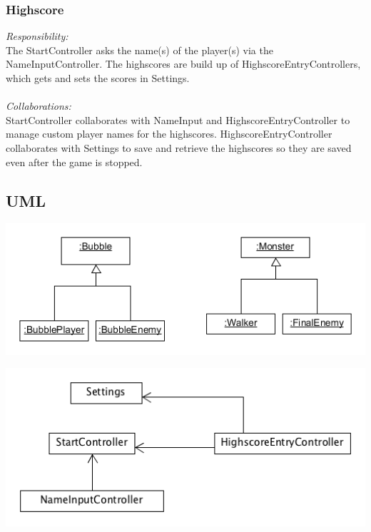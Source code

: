 \subsubsection{Highscore}
\textit{Responsibility:} \\
The StartController asks the name(s) of the player(s) via the NameInputController. The highscores are build up of HighscoreEntryControllers, which gets and sets the scores in Settings. \\ \\
\textit{Collaborations:} \\
StartController collaborates with NameInput and HighscoreEntryController to manage custom player names for the highscores. HighscoreEntryController collaborates with Settings to save and retrieve the highscores so they are saved even after the game is stopped.

\subsection{UML}
\includegraphics[width=150mm]{FinalEnemyUml.png}

\includegraphics[width=150mm]{HighscoreUML.png}